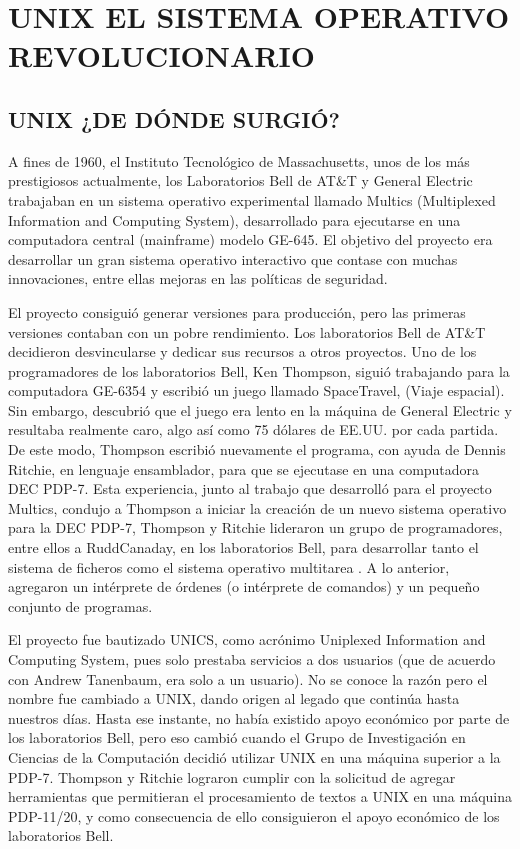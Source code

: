 \chapter*{UNIX EL SISTEMA OPERATIVO REVOLUCIONARIO}

\section*{UNIX ¿DE DÓNDE SURGIÓ?}
A fines de 1960, el Instituto Tecnológico de Massachusetts, unos  de los más prestigiosos actualmente, los Laboratorios Bell de AT\&T y General Electric trabajaban en un sistema 
operativo experimental llamado Multics (Multiplexed Information and Computing System), desarrollado para ejecutarse en una computadora central (mainframe) modelo GE-645. El 
objetivo del proyecto era desarrollar un gran sistema operativo interactivo que contase con muchas innovaciones, entre ellas mejoras en las políticas de seguridad.
 
El proyecto consiguió generar versiones para producción, pero las primeras versiones contaban con un pobre rendimiento. Los laboratorios Bell de AT\&T decidieron desvincularse y 
dedicar sus recursos a otros proyectos. Uno de los programadores de los laboratorios Bell, Ken Thompson, siguió trabajando para la computadora GE-6354 y escribió un juego llamado 
SpaceTravel, (Viaje espacial). Sin embargo, descubrió que el juego era lento en la máquina de General Electric y resultaba realmente caro, algo así como 75 dólares de EE.UU. por 
cada partida. De este modo, Thompson escribió nuevamente el programa, con ayuda de Dennis Ritchie, en lenguaje ensamblador, para que se ejecutase en una computadora DEC PDP-7. 
Esta experiencia, junto al trabajo que desarrolló para el proyecto Multics, condujo a Thompson a iniciar la creación de un nuevo sistema operativo para la DEC PDP-7, Thompson y 
Ritchie lideraron un grupo de programadores, entre ellos a RuddCanaday, en los laboratorios Bell, para desarrollar tanto el sistema de ficheros como el sistema operativo 
multitarea . A lo anterior, agregaron un intérprete de órdenes (o intérprete de comandos) y un pequeño conjunto de programas.
 
El proyecto fue bautizado UNICS, como acrónimo Uniplexed Information and Computing System, pues solo prestaba servicios a dos usuarios (que de acuerdo con Andrew Tanenbaum, era 
solo a un usuario). No se conoce la razón pero el nombre fue cambiado a UNIX, dando origen al legado que continúa hasta nuestros días. Hasta ese instante, no había existido  
apoyo económico por parte de los laboratorios Bell, pero eso cambió cuando el Grupo de Investigación en Ciencias de la Computación decidió utilizar UNIX en una máquina superior a 
la PDP-7. Thompson y Ritchie lograron cumplir con la solicitud de agregar herramientas que permitieran el procesamiento de textos a UNIX en una máquina PDP-11/20, y como 
consecuencia de ello consiguieron el apoyo económico de los laboratorios Bell.
 
